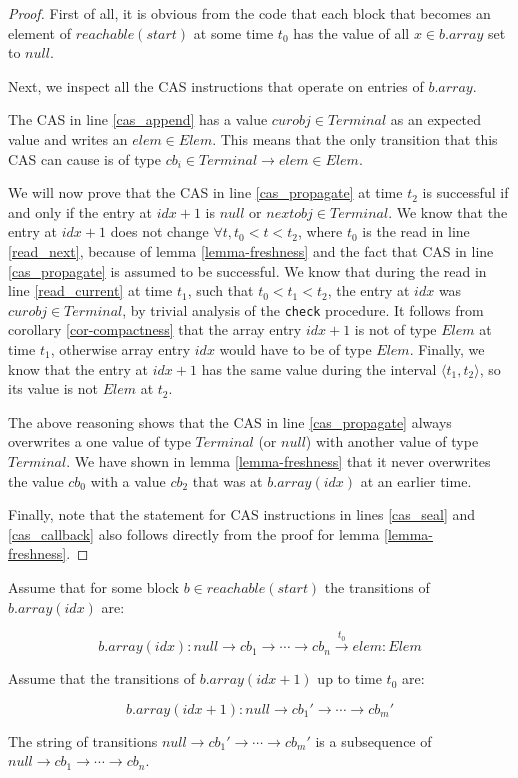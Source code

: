 \documentclass[runningheads,a4paper]{llncs}
\begin{document}
\begin{proof}
First of all, it is obvious from the code that each block that becomes
an element of $reachable(start)$ at some time $t_0$ has the value of
all $x \in b.array$ set to $null$.

Next, we inspect all the CAS instructions that operate on entries of
$b.array$.

The CAS in line \ref{cas_append} has a value $curobj \in Terminal$ as
an expected value and writes an $elem \in Elem$.
This means that the only transition that this CAS
can cause is of type $cb_i \in Terminal \rightarrow elem \in Elem$.

We will now prove that the CAS in line \ref{cas_propagate} at time $t_2$ is successful if and
only if the entry at $idx + 1$ is $null$ or $nextobj \in
Terminal$.
We know that the entry at $idx + 1$ does not change $\forall t, t_0 < t < t_2$,
where $t_0$ is the read in line \ref{read_next},
because of lemma \ref{lemma-freshness} and the fact that CAS in line \ref{cas_propagate} is assumed to be successful.
We know that during the read in line \ref{read_current} at time $t_1$,
such that $t_0 < t_1 < t_2$, the entry at $idx$ was $curobj \in
Terminal$, by trivial analysis of the \verb=check= procedure.
It follows from corollary \ref{cor-compactness} that the array entry $idx
+ 1$ is not of type $Elem$ at time $t_1$, otherwise array entry $idx$
would have to be of type $Elem$.
Finally, we know that the entry at $idx + 1$ has the same value during
the interval $\langle t_1, t_2 \rangle$, so its value is not $Elem$ at $t_2$.

The above reasoning shows that the CAS in line \ref{cas_propagate}
always overwrites a one value of type $Terminal$ (or $null$) with
another value of type $Terminal$.
We have shown in lemma \ref{lemma-freshness} that it never
overwrites the value $cb_0$ with a value $cb_2$ that was at
$b.array(idx)$ at an earlier time.

Finally, note that the statement for CAS instructions in lines \ref{cas_seal} and
\ref{cas_callback} also follows directly from the proof for lemma \ref{lemma-freshness}.
\end{proof}


\begin{lemma}[Subsequence]\label{lemma-subsequence}
Assume that for some block $b \in reachable(start)$ the transitions of
$b.array(idx)$ are:

\begin{equation*}
b.array(idx): null \rightarrow cb_1 \rightarrow \cdots \rightarrow
cb_n \stackrel{t_0}{\rightarrow} elem: Elem
\end{equation*}

Assume that the transitions of $b.array(idx + 1)$ up to time $t_0$ are:

\begin{equation*}
b.array(idx + 1): null \rightarrow cb_1' \rightarrow \cdots
\rightarrow cb_m'
\end{equation*}

The string of transitions $null \rightarrow cb_1' \rightarrow \cdots
\rightarrow cb_m'$ is a subsequence of $null \rightarrow cb_1
\rightarrow \cdots \rightarrow cb_n$.
\end{lemma}
\end{document}
